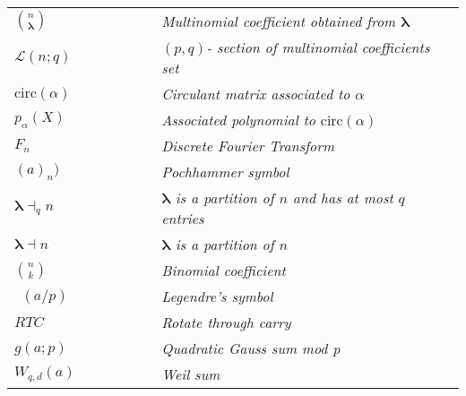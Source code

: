 \begin{spacing}{2.2}
\begin{tabular}{lcccccl}
\end{tabular} 

 \pagebreak
 \begin{tabular}{lcccccl}
  $\binom{n}{\boldsymbol{\lambda}}$     &&&&&&   {\it Multinomial coefficient obtained from $\boldsymbol{\lambda}$} \\
  $\mathcal{L}(n;q)$         &&&&&&   {\it $(p,q)$- section of multinomial coefficients set}\\
  $\text{circ}(\alpha)$      &&&&&&   {\it Circulant matrix associated to $\alpha$}\\
  $p_{\alpha}(X)$            &&&&&&   {\it Associated polynomial to $\text{circ}     (\alpha)$}\\
  $F_{n}$                    &&&&&&   {\it Discrete Fourier Transform}\\
  $(a)_n)$                   &&&&&&   {\it Pochhammer symbol}\\
 $\boldsymbol{\lambda} \dashv_q n$      &&&&&&   {\em $\boldsymbol{\lambda}$ is a partition of $n$ and has at most $q$ entries}\\
 $\boldsymbol{\lambda} \dashv n$        &&&&&&   {\em $\boldsymbol{\lambda}$ is a partition of $n$}\\
 $\binom{n}{k}$     &&&&&&   {\it Binomial coefficient}\\
 $$(a/p)$$          &&&&&&   {\it Legendre's symbol} \\
 $RTC$              &&&&&&   {\it Rotate through carry}\\
 $g(a;p)$           &&&&&&   {\it Quadratic Gauss sum mod p}\\
 $W_{q,d}(a)$       &&&&&&   {\it Weil sum}\\
 \end{tabular}
\end{spacing} 